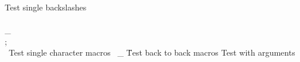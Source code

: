 \documentclass{article}
\author{Simple Test}
\begin{document}
	Test single backslashes \ \ \ \\ \\_ \\; \\\
	Test single character macros \; \, \_ \=
	Test back to back macros \test\test 
	Test with arguments \dummy[abc=1, b=1] 
\end{document}
